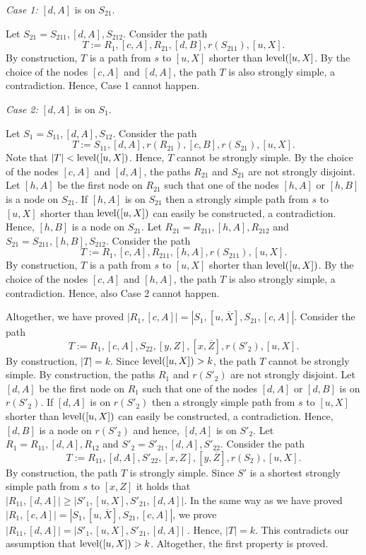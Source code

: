 \documentclass[12pt,twoside,a4paper]{article}
\def\lev{{\rm level}}
\begin{document}
\medskip
\noindent
{\em Case 1:} $[d,A]$ is on $S_{21}$.

\medskip
Let $S_{21} = S_{211},[d,A],S_{212}$. Consider the path 
$$T := R_1,[c,A],R_{21},[d,B],r(S_{211}),[u,X].$$
By construction, $T$ is a path from $s$ to $[u,X]$ shorter than $\lev([u,X]$.
By the choice of the nodes $[c,A]$ and $[d,A]$, the path $T$ is also strongly simple, a 
contradiction. Hence, Case 1 cannot happen.

\medskip
\noindent
{\em Case 2:} $[d,A]$ is on $S_1$.

\medskip
Let $S_1 = S_{11},[d,A],S_{12}$. Consider the path
$$T := S_{11},[d,A],r(R_{21}),[c,B],r(S_{21}),[u,X].$$
Note that $|T| < \lev([u,X])$. Hence, $T$ cannot be strongly simple. By the choice of the nodes
$[c,A]$ and $[d,A]$, the paths $R_{21}$ and $S_{21}$ are not strongly disjoint. Let
$[h,A]$ be the first node on $R_{21}$ such that one of the nodes $[h,A]$ or $[h,B]$ is a node on 
$S_{21}$. 
If $[h,A]$ is on $S_{21}$ then a strongly simple path from $s$ to $[u,X]$ shorter than $\lev([u,X])$ 
can easily be constructed, a contradiction. Hence, $[h,B]$ is a node on $S_{21}$. 
Let $R_{21} = R_{211},[h,A],R_{212}$ and $S_{21} = S_{211},[h,B],S_{212}$. Consider the path
$$T := R_1,[c,A],R_{211},[h,A],r(S_{211}),[u,X].$$
By construction, $T$ is a path from $s$ to $[u,X]$ shorter than $\lev([u,X])$.
By the choice of the nodes $[c,A]$ and $[h,A]$, the path $T$ is also strongly simple, a contradiction. 
Hence, also Case 2 cannot happen.

\medskip
Altogether, we have proved $|R_1,[c,A]| = |S_1,[u,\overline{X}],S_{21},[c,A]|$. Consider the path
$$T := R_1,[c,A],S_{22},[y,Z],[x,\overline{Z}],r(S'_2),[u,X].$$
By construction, $|T| = k$. Since $\lev([u,X]) > k$, the path $T$ cannot be strongly simple. By
construction, the paths $R_1$ and $r(S'_2)$ are not strongly disjoint. Let $[d,A]$ be the first
node on $R_1$ such that one of the nodes $[d,A]$ or $[d,B]$ is on $r(S'_2)$. 
If $[d,A]$ is on $r(S'_2)$ then a strongly simple path from $s$ to $[u,X]$ shorter than $\lev([u,X])$ 
can easily be constructed, a contradiction. Hence, $[d,B]$ is a node on $r(S'_2)$ and hence, $[d,A]$
is on $S'_2$.  Let
$R_1 = R_{11},[d,A],R_{12}$ and $S'_2 = S'_{21},[d,A],S'_{22}$. Consider the path
$$T := R_{11},[d,A],S'_{22},[x,Z],[y,\overline{Z}],r(S_2),[u,X].$$ 
By construction, the path $T$ is strongly simple. Since $S'$ is a shortest strongly simple
path from $s$ to $[x,Z]$ it holds that $|R_{11},[d,A]| \geq |S'_1,[u,X],S'_{21},[d,A]|$.
In the same way as we have proved $|R_1,[c,A]| = |S_1,[u,\overline{X}],S_{21},[c,A]|$, we prove 
$|R_{11},[d,A]| = |S'_1,[u,X],S'_{21},[d,A]|$ . Hence, $|T| = k$. This contradicts our assumption 
that $\lev([u,X]) > k$. 
Altogether, the first property is proved.
\end{document}
